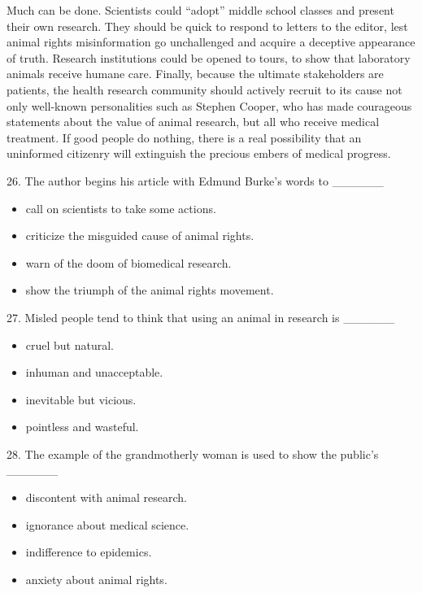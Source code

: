 \documentclass[UTF8,11pt]{ctexart}
\begin{document}
Much can be done. Scientists could “adopt” middle school classes and present their own research. They should be quick to respond to letters to the editor, lest animal rights misinformation go unchallenged and acquire a deceptive appearance of truth. Research institutions could be opened to tours, to show that laboratory animals receive humane care. Finally, because the ultimate stakeholders are patients, the health research community should actively recruit to its cause not only well-known personalities such as Stephen Cooper, who has made courageous statements about the value of animal research, but all who receive medical treatment. If good people do nothing, there is a real possibility that an uninformed citizenry will extinguish the precious embers of medical progress.


26. The author begins his article with Edmund Burke’s words to \_\_\_\_\_\_


\begin{itemize}[leftmargin=2em,itemsep=.2em,topsep=.4em]\item[A.] call on scientists to take some actions.
\item[B.] criticize the misguided cause of animal rights.
\item[C.] warn of the doom of biomedical research.
\item[D.] show the triumph of the animal rights movement.
\end{itemize}

27. Misled people tend to think that using an animal in research is \_\_\_\_\_\_


\begin{itemize}[leftmargin=2em,itemsep=.2em,topsep=.4em]\item[A.] cruel but natural.
\item[B.] inhuman and unacceptable.
\item[C.] inevitable but vicious.
\item[D.] pointless and wasteful.
\end{itemize}

28. The example of the grandmotherly woman is used to show the public’s \_\_\_\_\_\_


\begin{itemize}[leftmargin=2em,itemsep=.2em,topsep=.4em]\item[A.] discontent with animal research.
\item[B.] ignorance about medical science.
\item[C.] indifference to epidemics.
\item[D.] anxiety about animal rights.
\end{itemize}
\end{document}
